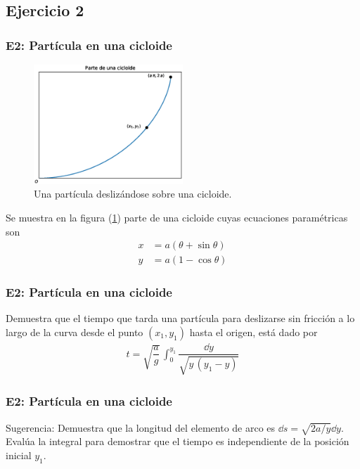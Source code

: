 \subsection{Ejercicio 2}
\begin{frame}
\frametitle{E2: Partícula en una cicloide}
\begin{figure}
    \centering
    \includegraphics[width=0.5\textwidth]{Imagenes/plot_cicloide.eps}
    \caption{Una partícula deslizándose sobre una cicloide.}
    \label{fig:figura_cicloide}
\end{figure}
Se muestra en la figura (\ref{fig:figura_cicloide}) parte de una cicloide cuyas ecuaciones paramétricas son
\begin{align*}
x &= a (\theta + \sin \theta) \\[0.5em]
y &= a (1 - \cos \theta)
\end{align*}
\end{frame}
\begin{frame}
\frametitle{E2: Partícula en una cicloide}
Demuestra que el tiempo que tarda una partícula para deslizarse sin fricción a lo largo de la curva desde el punto $(x_{1}, y_{1})$ hasta el origen, está dado por
\begin{align*}
t = \sqrt{\dfrac{a}{g}} \, \int_{0}^{y_{1}} \dfrac{\dd{y}}{\sqrt{y \, (y_{1}- y)}}
\end{align*}
\end{frame}
\begin{frame}
\frametitle{E2: Partícula en una cicloide}
Sugerencia: Demuestra que la longitud del elemento de arco es $\dd{s} = \sqrt{2a/y} \dd{y}$.
\\
\bigskip
Evalúa la integral para demostrar que el tiempo es independiente de la posición inicial $y_{1}$.
\end{frame}
